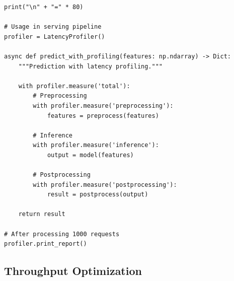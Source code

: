 \begin{lstlisting}[style=python, caption=Detailed latency profiling]
        print("\n" + "=" * 80)

# Usage in serving pipeline
profiler = LatencyProfiler()

async def predict_with_profiling(features: np.ndarray) -> Dict:
    """Prediction with latency profiling."""

    with profiler.measure('total'):
        # Preprocessing
        with profiler.measure('preprocessing'):
            features = preprocess(features)

        # Inference
        with profiler.measure('inference'):
            output = model(features)

        # Postprocessing
        with profiler.measure('postprocessing'):
            result = postprocess(output)

    return result

# After processing 1000 requests
profiler.print_report()
\end{lstlisting}

\subsection{Throughput Optimization}

